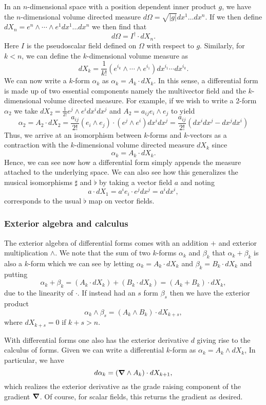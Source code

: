 In an $n$-dimensional space with a position dependent inner product $g$, we have the $n$-dimensional volume directed measure $d\Omega = \sqrt{|g|} dx^1\dots dx^n$. If we then define $dX_n = e^n \wedge \cdots \wedge e^1 dx^1 \dots dx^n$ we then find that
\[
d\Omega = I^\dagger \cdot dX_n.
\]
Here $I$ is the pseudoscalar field defined on $\Omega$ with respect to $g$. Similarly, for $k<n$, we can define the $k$-dimensional volume measure as 
\[
dX_k = \frac{1}{k!}(e^{i_k}\wedge \cdots \wedge e^{i_1}) dx^{i_1} \cdots dx^{i_k}.
\]
We can now write a $k$-form $\alpha_k$ as $\alpha_k = A_k \cdot dX_k$. In this sense, a differential form is made up of two essential components namely the multivector field and the $k$-dimensional volume directed measure. For example, if we wish to write a 2-form $\alpha_2$ we take $dX_2 = \frac{1}{2!} e^j \wedge e^i dx^i dx^j$ and $A_2 = a_{ij} e_i \wedge e_j$ to yield
\[
\alpha_2 = A_2 \cdot dX_2 = \frac{a_{ij}}{2!} (e_i \wedge e_j) \cdot (e^j \wedge e^i) dx^i dx^j = \frac{a_{ij}}{2!} (dx^i dx^j - dx^j dx^i)
\]
Thus, we arrive at an isomorphism between $k$-forms and $k$-vectors as a contraction with the $k$-dimensional volume directed measure $dX_k$ since
\[
\alpha_k = A_k \cdot dX_k.
\]
Hence, we can see now how a differential form simply appends the measure attached to the underlying space. We can also see how this generalizes the musical isomorphisms $\sharp$ and $\flat$ by taking a vector field $a$ and noting
\begin{equation}
\label{eq:line_element}
a \cdot dX_1 = a^i e_i \cdot e^j dx^j = a^i dx^i,
\end{equation}
corresponds to the usual $\flat$ map on vector fields.

\subsubsection{Exterior algebra and calculus}
The exterior algebra of differential forms comes with an addition $+$ and exterior multiplication $\wedge$.  We note that the sum of two $k$-forms $\alpha_k$ and $\beta_k$ that $\alpha_k+\beta_k$ is also a $k$-form which we can see by letting $\alpha_k = A_k \cdot dX_k$ and $\beta_k = B_k \cdot dX_k$ and putting
\[
\alpha_k + \beta_k = (A_k \cdot dX_k)+(B_k \cdot dX_k) = (A_k + B_k) \cdot dX_k,
\]
due to the linearity of $\cdot$.  If instead had an $s$ form $\beta_s$ then we have the exterior product
\[
\alpha_k \wedge \beta_s = (A_k \wedge B_k) \cdot dX_{k+s},
\]
where $dX_{k+s}=0$ if $k+s>n$.  

With differential forms one also has the exterior derivative $d$ giving rise to the calculus of forms.  Given we can write a differential $k$-form as $\alpha_k = A_k \wedge dX_k$,  In particular, we have
\[
d \alpha_k = (\boldsymbol{\nabla} \wedge A_k) \cdot dX_{k+1},
\]
which realizes the exterior derivative as the grade raising component of the gradient $\boldsymbol{\nabla}$. Of course, for scalar fields, this returns the gradient as desired. 

